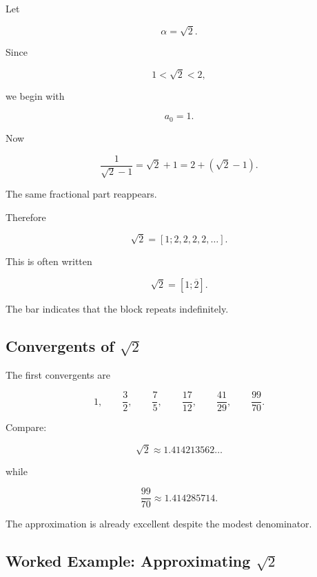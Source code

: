 Let

\[ \alpha=\sqrt2. \]

Since

\[ 1<\sqrt2<2, \]

we begin with

\[ a_0=1. \]

Now

\[
\frac1{\sqrt2-1}
=
\sqrt2+1
=
2+(\sqrt2-1).
\]

The same fractional part reappears.

Therefore

\[ \boxed{\sqrt2=[1;2,2,2,2,\ldots].} \]

This is often written

\[ \boxed{\sqrt2=[1;\overline{2}].} \]

The bar indicates that the block repeats indefinitely.

\subsection{Convergents of \(\sqrt2\)}
\label{subsec:sqrt2-convergents}

The first convergents are

\[
1,\qquad
\frac32,\qquad
\frac75,\qquad
\frac{17}{12},\qquad
\frac{41}{29},\qquad
\frac{99}{70}.
\]

Compare:

\[
\sqrt2\approx1.414213562\ldots
\]

while

\[ \frac{99}{70}\approx1.414285714. \]

The approximation is already excellent despite the modest denominator.

\subsection{Worked Example: Approximating \(\sqrt2\)}
\label{subsec:worked-sqrt2-convergent}

